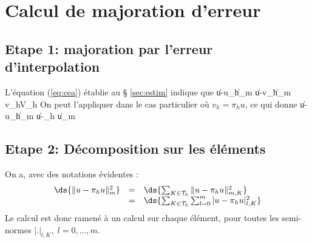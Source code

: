 \section{Calcul de majoration d'erreur}
%
\subsection{Etape 1: majoration par l'erreur d'interpolation}
%
\noindent
%
L'\'equation (\ref{eq:cea}) \'etablie au \S \/ \ref{sec:estim} indique que
\be
\|u-u_h\|_m \le {}\; \|u-v_h\|_m \quad \forall v_h\in V_h
\ee
%
On peut l'appliquer dans le cas particulier o\`u $v_h=\pi_h u$, ce qui donne
\be
\|u-u_h\|_m \le {}\; \|u-\pi_h u\|_m
\label{eq:cea2}
\ee
%
%
\subsection{Etape 2: D\'ecomposition sur les \'el\'ements}
%
\noindent
%
On a, avec des notations \'evidentes :
$$
\begin{array}{lll}
\ds{\|u-\pi_h u\|_m^2 }& = &\ds{\sum_{K\in{\cal T}_h} \|u-\pi_h u\|_{m,K}^2 }\\
& = & \ds{\sum_{K\in{\cal T}_h} \sum_{l=0}^m |u-\pi_h u|_{l,K}^2}
\end{array}
$$
%
Le calcul est donc ramen\'e \`a un calcul sur chaque \'el\'ement, pour toutes les semi-normes $|.|_{l,K},\; l=0,\ldots,m$.
%
%
